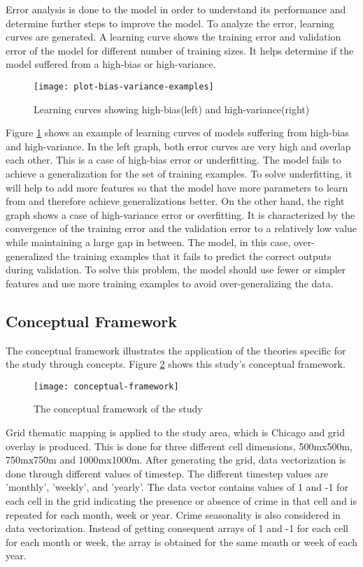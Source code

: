 Error analysis is done to the model in order to understand its performance and determine further steps to improve the model. To analyze the error, learning curves are generated. A learning curve shows the training error and validation error of the model for different number of training sizes. It helps determine if the model suffered from a high-bias or high-variance.
\begin{figure}[H]
    \centering
    \texttt{[image: plot-bias-variance-examples]}
    \caption{Learning curves showing high-bias(left) and high-variance(right) \cite{scikit-learn}}
    \label{fig:learning-curve-sample}
\end{figure}

Figure \ref{fig:learning-curve-sample} shows an example of learning curves of models suffering from high-bias and high-variance. In the left graph, both error curves are very high and overlap each other. This is a case of high-bias error or underfitting. The model fails to achieve a generalization for the set of training examples. To solve underfitting, it will help to add more features so that the model have more parameters to learn from and therefore achieve generalizations better. On the other hand, the right graph shows a case of high-variance error or overfitting. It is characterized by the convergence of the training error and the validation error to a relatively low value while maintaining a large gap in between. The model, in this case, over-generalized the training examples that it fails to predict the correct outputs during validation. To solve this problem, the model should use fewer or simpler features and use more training examples to avoid over-generalizing the data.

\subsection{Conceptual Framework}
The conceptual framework illustrates the application of the theories specific for the study through concepts. Figure \ref{fig:conceptual-framework} shows this study's conceptual framework.
\begin{figure}[H]
    \centering
    \texttt{[image: conceptual-framework]}
    \caption{The conceptual framework of the study}
    \label{fig:conceptual-framework}
\end{figure}
Grid thematic mapping is applied to the study area, which is Chicago and grid overlay is produced. This is done for three different cell dimensions, 500mx500m, 750mx750m and 1000mx1000m. After generating the grid, data vectorization is done through different values of timestep. The different timestep values are 'monthly', 'weekly', and 'yearly'. The data vector contains values of 1 and -1 for each cell in the grid indicating the presence or absence of crime in that cell and is repeated for each month, week or year. Crime seasonality is also considered in data vectorization. Instead of getting consequent arrays of 1 and -1 for each cell for each month or week, the array is obtained for the same month or week of each year.

